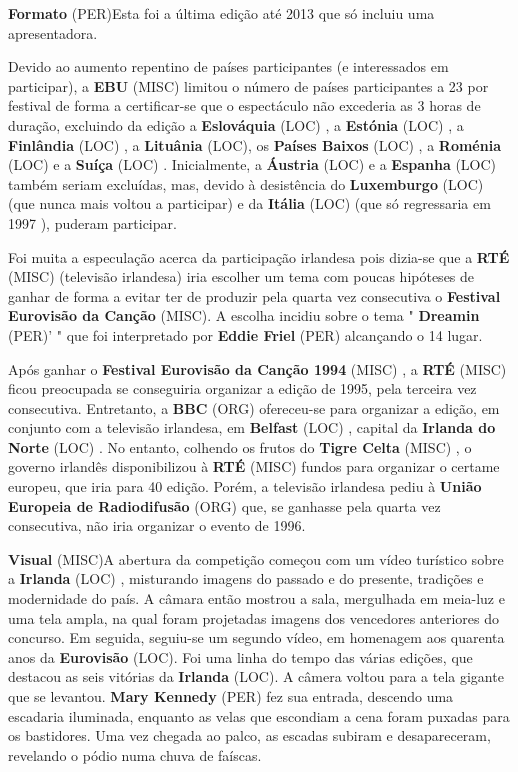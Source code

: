 \documentclass[12pt,a4paper]{article}
\begin{document}
\textbf{Formato} (PER)Esta foi a última edição até 2013 que só incluiu uma apresentadora.

Devido ao aumento repentino de países participantes (e interessados em participar), a \textbf{EBU} (MISC) limitou o número de países participantes a 23 por festival de forma a certificar-se que o espectáculo não excederia as 3 horas de duração, excluindo da edição a \textbf{Eslováquia} (LOC) , a \textbf{Estónia} (LOC) , a \textbf{Finlândia} (LOC) , a \textbf{Lituânia} (LOC), os \textbf{Países Baixos} (LOC) , a \textbf{Roménia} (LOC) e a \textbf{Suíça} (LOC) . Inicialmente, a \textbf{Áustria} (LOC) e a \textbf{Espanha} (LOC) também seriam excluídas, mas, devido à desistência do \textbf{Luxemburgo} (LOC) (que nunca mais voltou a participar) e da \textbf{Itália} (LOC) (que só regressaria em 1997 ), puderam participar.

Foi muita a especulação acerca da participação irlandesa pois dizia-se que a \textbf{RTÉ} (MISC) (televisão irlandesa) iria escolher um tema com poucas hipóteses de ganhar de forma a evitar ter de produzir pela quarta vez consecutiva o \textbf{Festival Eurovisão da Canção} (MISC). A escolha incidiu sobre o tema " \textbf{Dreamin} (PER)' " que foi interpretado por \textbf{Eddie Friel} (PER) alcançando o 14 lugar.

Após ganhar o \textbf{Festival Eurovisão da Canção 1994} (MISC) , a \textbf{RTÉ} (MISC) ficou preocupada se conseguiria organizar a edição de 1995, pela terceira vez consecutiva. Entretanto, a \textbf{BBC} (ORG) ofereceu-se para organizar a edição, em conjunto com a televisão irlandesa, em \textbf{Belfast} (LOC) , capital da \textbf{Irlanda do Norte} (LOC) . No entanto, colhendo os frutos do \textbf{Tigre Celta} (MISC) , o governo irlandês disponibilizou à \textbf{RTÉ} (MISC) fundos para organizar o certame europeu, que iria para 40 edição. Porém, a televisão irlandesa pediu à \textbf{União Europeia de Radiodifusão} (ORG) que, se ganhasse pela quarta vez consecutiva, não iria organizar o evento de 1996.



\textbf{Visual} (MISC)A abertura da competição começou com um vídeo turístico sobre a \textbf{Irlanda} (LOC) , misturando imagens do passado e do presente, tradições e modernidade do país. A câmara então mostrou a sala, mergulhada em meia-luz e uma tela ampla, na qual foram projetadas imagens dos vencedores anteriores do concurso. Em seguida, seguiu-se um segundo vídeo, em homenagem aos quarenta anos da \textbf{Eurovisão} (LOC). Foi uma linha do tempo das várias edições, que destacou as seis vitórias da \textbf{Irlanda} (LOC). A câmera voltou para a tela gigante que se levantou. \textbf{Mary Kennedy} (PER) fez sua entrada, descendo uma escadaria iluminada, enquanto as velas que escondiam a cena foram puxadas para os bastidores. Uma vez chegada ao palco, as escadas subiram e desapareceram, revelando o pódio numa chuva de faíscas.
\end{document}
